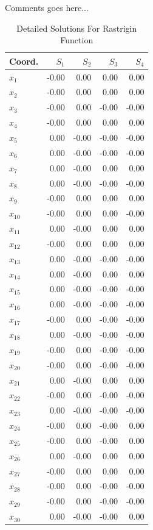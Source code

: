 \documentclass{ieeeaccess}
\begin{document}
Comments goes here...
\begin{table}
\centering
\caption{Detailed Solutions For Rastrigin Function}
\label{detailedsolutions:rastrigin30d}
\begin{tabular}{lrrrr}
\toprule
  Coord. &  $S_{1}$ &  $S_{2}$ &  $S_{3}$ &  $S_{4}$ \\
\midrule
 $x_{1}$ &    -0.00 &     0.00 &     0.00 &     0.00 \\
 $x_{2}$ &    -0.00 &     0.00 &     0.00 &     0.00 \\
 $x_{3}$ &    -0.00 &     0.00 &    -0.00 &    -0.00 \\
 $x_{4}$ &    -0.00 &     0.00 &     0.00 &     0.00 \\
 $x_{5}$ &     0.00 &    -0.00 &    -0.00 &    -0.00 \\
 $x_{6}$ &     0.00 &    -0.00 &    -0.00 &    -0.00 \\
 $x_{7}$ &     0.00 &    -0.00 &     0.00 &     0.00 \\
 $x_{8}$ &     0.00 &    -0.00 &    -0.00 &    -0.00 \\
 $x_{9}$ &    -0.00 &     0.00 &     0.00 &     0.00 \\
$x_{10}$ &    -0.00 &     0.00 &     0.00 &    -0.00 \\
$x_{11}$ &     0.00 &    -0.00 &     0.00 &     0.00 \\
$x_{12}$ &    -0.00 &     0.00 &     0.00 &     0.00 \\
$x_{13}$ &     0.00 &    -0.00 &    -0.00 &    -0.00 \\
$x_{14}$ &     0.00 &    -0.00 &     0.00 &     0.00 \\
$x_{15}$ &     0.00 &    -0.00 &    -0.00 &    -0.00 \\
$x_{16}$ &     0.00 &    -0.00 &    -0.00 &    -0.00 \\
$x_{17}$ &    -0.00 &     0.00 &    -0.00 &    -0.00 \\
$x_{18}$ &     0.00 &    -0.00 &    -0.00 &    -0.00 \\
$x_{19}$ &    -0.00 &     0.00 &    -0.00 &    -0.00 \\
$x_{20}$ &    -0.00 &     0.00 &    -0.00 &    -0.00 \\
$x_{21}$ &     0.00 &    -0.00 &     0.00 &     0.00 \\
$x_{22}$ &    -0.00 &     0.00 &    -0.00 &    -0.00 \\
$x_{23}$ &     0.00 &    -0.00 &    -0.00 &    -0.00 \\
$x_{24}$ &    -0.00 &     0.00 &    -0.00 &     0.00 \\
$x_{25}$ &    -0.00 &     0.00 &    -0.00 &     0.00 \\
$x_{26}$ &     0.00 &    -0.00 &     0.00 &     0.00 \\
$x_{27}$ &    -0.00 &     0.00 &     0.00 &     0.00 \\
$x_{28}$ &    -0.00 &     0.00 &    -0.00 &    -0.00 \\
$x_{29}$ &    -0.00 &     0.00 &    -0.00 &    -0.00 \\
$x_{30}$ &     0.00 &    -0.00 &    -0.00 &     0.00 \\
\bottomrule
\end{tabular}
\end{table}
\end{document}
